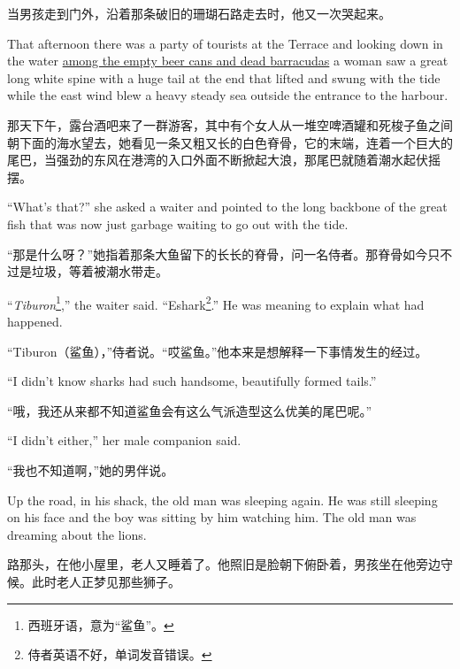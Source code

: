 \begin{paracol}{2}
\switchcolumn

当男孩走到门外，沿着那条破旧的珊瑚石路走去时，他又一次哭起来。

\switchcolumn*

That afternoon there was a party of tourists at the Terrace and looking down
in the water \uline{among the empty beer cans and dead \glspl{barracuda}} a
woman saw a great long white \gls{spine} with a huge tail at the end that
lifted and swung with the \gls{tide} while the east wind blew a heavy steady
sea outside the \gls{entrance} to the harbour.

\switchcolumn

那天下午，露台酒吧来了一群游客，其中有个女人从一堆空啤酒罐和死梭子鱼之间朝下面的海水望去，她看见一条又粗又长的白色脊骨，它的末端，连着一个巨大的尾巴，当强劲的东风在港湾的入口外面不断掀起大浪，那尾巴就随着潮水起伏摇摆。

\switchcolumn*

``What's that?'' she asked a waiter and pointed to the long backbone of the
great fish that was now just \gls{garbage} waiting to go out with the tide.

\switchcolumn

“那是什么呀？”她指着那条大鱼留下的长长的脊骨，问一名侍者。那脊骨如今只不过是垃圾，等着被潮水带走。

\switchcolumn*

``\emph{Tiburon}\footnote{西班牙语，意为“鲨鱼”。},'' the waiter said.
``Eshark\footnote{侍者英语不好，单词发音错误。}.'' He was meaning to explain
what had happened.

\switchcolumn

“Tiburon（鲨鱼），”侍者说。“哎鲨鱼。”他本来是想解释一下事情发生的经过。

\switchcolumn*

``I didn't know sharks had such handsome, \gls{beautifully} formed tails.''

\switchcolumn

“哦，我还从来都不知道鲨鱼会有这么气派造型这么优美的尾巴呢。”

\switchcolumn*

``I didn't either,'' her male \gls{companion} said.

\switchcolumn

“我也不知道啊，”她的男伴说。

\switchcolumn*

Up the road, in his shack, the old man was sleeping again. He was still
sleeping on his face and the boy was sitting by him watching him. The old
man was dreaming about the lions.


\switchcolumn

路那头，在他小屋里，老人又睡着了。他照旧是脸朝下俯卧着，男孩坐在他旁边守候。此时老人正梦见那些狮子。


\switchcolumn*

\end{paracol}
